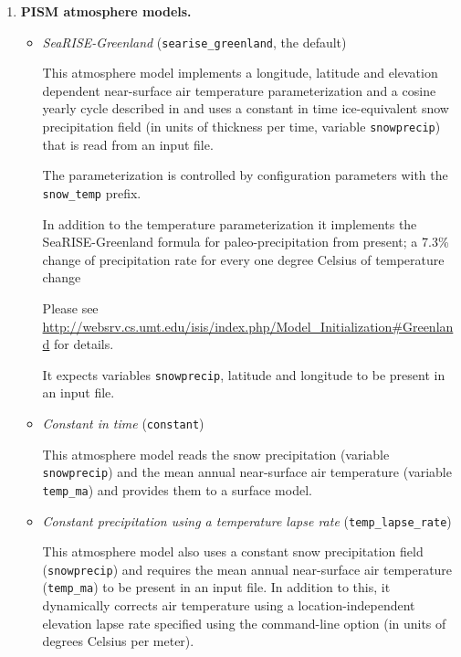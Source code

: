 \begin{enumerate}
\item \textbf{PISM atmosphere models.}
  \begin{itemize}
  \item \emph{SeaRISE-Greenland} (\texttt{searise_greenland}, the default)

    This atmosphere model implements a longitude, latitude and elevation dependent near-surface air temperature parameterization and a cosine yearly cycle described in \cite{Faustoetal2009} and uses a constant in time ice-equivalent snow precipitation field (in units of thickness per time, variable \texttt{snowprecip}) that is read from an input file.

    The parameterization is controlled by configuration parameters with the \texttt{snow_temp} prefix.

    In addition to the temperature parameterization it implements the SeaRISE-Greenland formula for paleo-precipitation from present; a 7.3\% change of precipitation rate for every one degree Celsius of temperature change \cite{Huybrechts02}

    Please see \url{http://websrv.cs.umt.edu/isis/index.php/Model_Initialization#Greenland} for details.

    It expects variables \texttt{snowprecip}, latitude and longitude to be present in an input file.

 \item \emph{Constant in time} (\texttt{constant})

    This atmosphere model reads the snow precipitation (variable \texttt{snowprecip}) and the mean annual near-surface air temperature (variable \texttt{temp_ma}) and provides them to a surface model.
  \item \emph{Constant precipitation using a temperature lapse rate} (\texttt{temp_lapse_rate})
    
    This atmosphere model also uses a constant snow precipitation field (\texttt{snowprecip}) and requires the mean annual near-surface air temperature (\texttt{temp_ma}) to be present in an input file. In addition to this, it dynamically corrects air temperature using a location-independent elevation lapse rate specified using the  command-line option (in units of degrees Celsius per meter).
 \end{itemize}


\end{enumerate}
